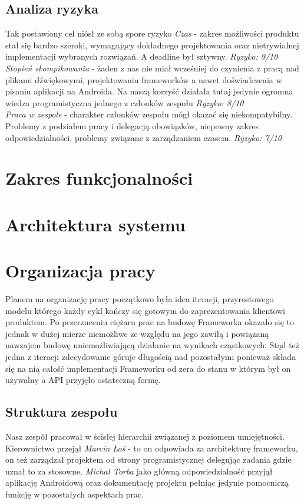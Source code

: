 \section{Analiza ryzyka}
Tak postawiony cel niósł ze sobą spore ryzyko
\emph{Czas} - zakres możliwości produktu stał się bardzo szeroki, wymagający dokładnego projektowania oraz nietrywialnej implementacji wybranych rozwiązań. A deadline był sztywny. \emph{Ryzyko: 9/10}
\\
\emph{Stopień skompikowania} - żaden z nas nie miał wcześniej do czynienia z pracą nad plikami dźwiękowymi, projektowaniu frameworków a nawet doświadczenia w pisaniu aplikacji na Androida. Na naszą korzyść działała tutaj jedynie ogromna wiedza programistyczna jednego z członków zespołu \emph{Ryzyko: 8/10}
\\
\emph{Praca w zespole} - charakter członków zespołu mógł okazać się niekompatybilny. Problemy z podziałem pracy i delegacją obowiązków, niepewny zakres odpowiedzialności, problemy związane z zarządzaniem czasem. \emph{Ryzyko: 7/10} 
 
\chapter{Zakres funkcjonalności}


\chapter{Architektura systemu}
\chapter{Organizacja pracy}
Planem na organizację pracy początkowo była idea iteracji, przyrostowego modelu którego każdy cykl kończy się gotowym do zaprezentowania klientowi produktem. Po przerzuceniu ciężaru prac na budowę Frameworka okazało się to jednak w dużej mierze niemożliwe ze względu na jego zawiłą i powiązaną nawzajem budowę uniemożliwiającą działanie na wynikach cząstkowych. Stąd też jedna z iteracji zdecydowanie góruje długością nad pozostałymi ponieważ składa się na nią całość implementacji Frameworku od zera do stanu w którym był on używalny a API przyjęło ostateczną formę.

\section{Struktura zespołu}
Nasz zespół pracował w ścisłej hierarchii związanej z poziomem umiejętności. Kierownictwo przejął \emph{Marcin Łoś} - to on odpowiada za architekturę frameworku, on też zarządzał projektem od strony programistycznej delegując zadania gdzie uznał to za stosowne. \emph{Michał Torba} jako główną odpowiedzialność przyjął aplikację Androidową oraz dokumentację projektu pełniąc jedynie pomocniczą funkcję w pozostałych aspektach prac.
